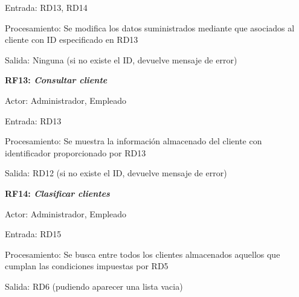 \documentclass[paper=a4, fontsize=11pt, spanish]{scrartcl}
\begin{document}
Entrada: RD13, RD14

Procesamiento: Se modifica los datos suministrados mediante que asociados al cliente con ID especificado en RD13

Salida: Ninguna (si no existe el ID, devuelve mensaje de error)

\setlength{\parindent}{0em}
\textbf{RF13: \textit{Consultar cliente}}
\setlength{\parindent}{2em}

Actor: Administrador, Empleado

Entrada: RD13

Procesamiento: Se muestra la información almacenado del cliente con identificador proporcionado por RD13

Salida:  RD12 (si no existe el ID, devuelve mensaje de error)

\setlength{\parindent}{0em}
\textbf{RF14: \textit{Clasificar clientes}}
\setlength{\parindent}{2em}

Actor: Administrador, Empleado

Entrada: RD15

Procesamiento:  Se busca entre todos los clientes almacenados aquellos que cumplan las condiciones impuestas por RD5

Salida: RD6 (pudiendo aparecer una lista vacia)
\end{document}
